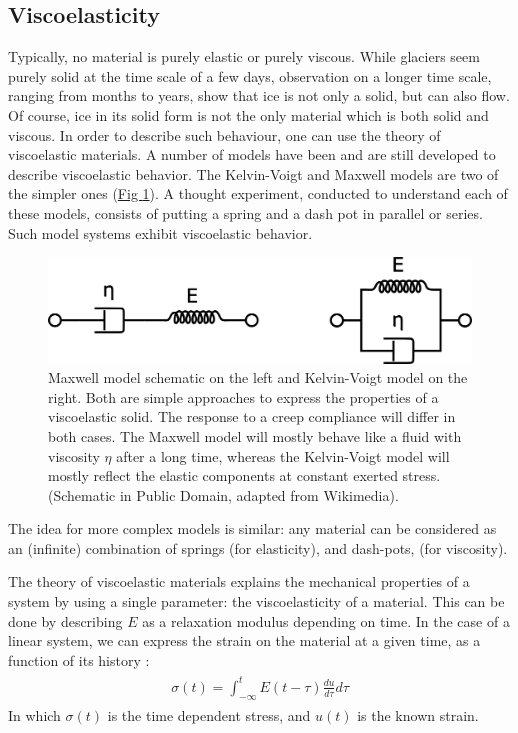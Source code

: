 \documentclass[A4paperpaper,11pt,english]{sphinxmanual}
\begin{document}
\subsection{Viscoelasticity}
\label{index-latex:viscoelasticity}
Typically, no material is purely elastic or purely viscous. While glaciers
seem purely solid at the time scale of a few days, observation on a longer time
scale, ranging from months to years, show that ice is not only a
solid, but can also flow. Of course, ice in its solid form is not the only
material which is both solid and viscous. In order to describe such
behaviour, one can use the theory of viscoelastic materials.  A number of models have
been and are still developed to describe viscoelastic behavior. The
Kelvin-Voigt and Maxwell models are two of the simpler ones (\hyperref[index-latex:fig-mkv]{Fig  \ref*{index-latex:fig-mkv}}). A thought
experiment, conducted to understand each of these models, consists of putting a spring and a dash pot
in parallel or series. Such model systems exhibit viscoelastic behavior.
\begin{figure}[htbp]
\centering
\capstart

\includegraphics[width=0.700\linewidth]{MKV.png}
\caption{Maxwell model schematic on the left and Kelvin-Voigt model on the right.
Both are simple approaches to express the properties of a viscoelastic
solid. The response to a creep compliance will differ in both cases. The Maxwell
model will mostly behave like a fluid with viscosity \(\eta\) after a
long time, whereas the Kelvin-Voigt model will mostly reflect the elastic
components at constant exerted stress. (Schematic in Public Domain, adapted
from Wikimedia).}\label{index-latex:fig-mkv}\end{figure}

The idea for more complex models is similar: any material can be considered as an
(infinite) combination of springs (for elasticity), and dash-pots, (for viscosity).

The theory of viscoelastic materials explains the mechanical properties of a system by
using a single parameter: the viscoelasticity of a material. This can
be done by describing \(E\) as a relaxation modulus depending on time.  In
the case of a linear system, we can express the strain on the material at a given
time, as a function of its history :
\label{index-latex:equation-strain}\begin{gather}
\begin{split}\sigma (t)  = \int_{-\infty}^t E(t-\tau) \frac{du}{d\tau} d\tau\end{split}\label{index-latex-strain}
\end{gather}
In which \(\sigma(t)\) is the time dependent stress, and \(u(t)\) is
the known strain.
\end{document}
